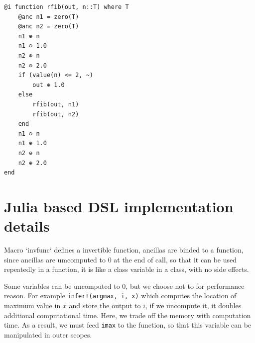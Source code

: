 \documentclass[aps,twocolumn,longbibliography,english,superscriptaddress,prr]{revtex4-1}
\newcommand{\<}{\langle}
\renewcommand{\>}{\rangle}
\begin{document}
\begin{minipage}{.44\textwidth}
\begin{lstlisting}
@i function rfib(out, n::T) where T
    @anc n1 = zero(T)
    @anc n2 = zero(T)
    n1 ⊕ n
    n1 ⊖ 1.0
    n2 ⊕ n
    n2 ⊖ 2.0
    if (value(n) <= 2, ~)
        out ⊕ 1.0
    else
        rfib(out, n1)
        rfib(out, n2)
    end
    n1 ⊖ n
    n1 ⊕ 1.0
    n2 ⊖ n
    n2 ⊕ 2.0
end
\end{lstlisting}
\end{minipage}


\section{Julia based DSL implementation details}

Macro `invfunc` defines a invertible function, ancillas are binded to a function, since ancillas are umcomputed to $0$ at the end of call, so that it can be used repeatedly in a function, it is like a class variable in a class, with no side effects.

Some variables can be uncomputed to $0$, but we choose not to for performance reason. For example
\texttt{infer!(argmax, i, x)} which computes the location of maximum value in $x$ and store the output to $i$, if we uncompute it, it doubles additional computational time. Here, we trade off the memory with computation time. As a result, we must feed \texttt{imax} to the function, so that this variable can be manipulated in outer scopes.
\end{document}
